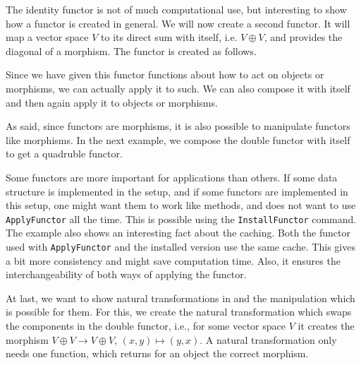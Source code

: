 \begin{small}

\end{small}

The identity functor is not of much computational use, but interesting to show how a functor is created in general. We will now create a second functor. It will
map a vector space $V$ to its direct sum with itself, i.e. $V \oplus V$, and provides the diagonal of a morphism. The functor is created as follows.



Since we have given this functor functions about how to act on objects or morphisms, we can actually apply it to such. We can also compose it with itself
and then again apply it to objects or morphisms.

\begin{small}

\end{small}

As said, since functors are morphisms, it is also possible to manipulate functors like morphisms. In the next example, we compose the double functor with itself
to get a quadruble functor.

\begin{small}

\end{small}

Some functors are more important for applications than others. If some data structure is implemented in the \CapPkg setup, and if some functors are implemented
in this setup, one might want them to work like methods, and does not want to use \texttt{ApplyFunctor} all the time. This is possible using the \texttt{InstallFunctor}
command. The example also shows an interesting fact about the caching. Both the functor used with \texttt{ApplyFunctor} and the installed version use the same cache. This
gives a bit more consistency and might save computation time. Also, it ensures the interchangeability of both ways of applying the functor.

\begin{small}

\end{small}

At last, we want to show natural transformations in \CapPkg and the manipulation which is possible for them. For this, we create the natural transformation which
swaps the components in the double functor, i.e., for some vector space $V$ it creates the morphism $V \oplus V \rightarrow V \oplus V$, $\left( x,y \right) \mapsto \left( y,x \right)$.
A natural transformation only needs one function, which returns for an object the correct morphism.

